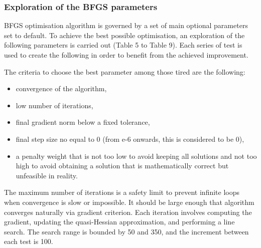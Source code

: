 \subsubsection{Exploration of the BFGS parameters}
BFGS optimisation algorithm is governed by a set of main optional parameters set to default. To achieve the best possible optimisation, an exploration of the following parameters is carried out (Table 5 to Table 9). Each series of test is used to create the following in order to benefit from the achieved improvement.

The criteria to choose the best parameter among those tired are the following:
\begin{itemize}
	\item convergence of the algorithm,
	\item low number of iterations,
	\item final gradient norm below a fixed tolerance,
	\item final step size no equal to 0 (from e-6 onwards, this is considered to be 0),
	\item a penalty weight that is not too low to avoid keeping all solutions and not too high to avoid obtaining a solution that is mathematically correct but unfeasible in reality.
\end{itemize}

The maximum number of iterations is a safety limit to prevent infinite loops when convergence is slow or impossible. It should be large enough that algorithm converges naturally via gradient criterion. Each iteration involves computing the gradient, updating the quasi-Hessian approximation, and performing a line search. \cite[Chapter 8]{nocedalwright2006}
The search range is bounded by 50 and 350, and the increment between each test is 100.
\begin{table}[H]
    \centering
    \caption{Exploration of maximum iterations}
    \label{tab:truss_exp_iter}
\end{table}

